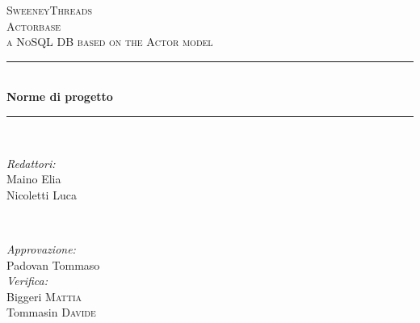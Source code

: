 \documentclass[a4paper]{report}
\begin{document}
	
	\begin{titlepage}
		\newcommand{\HRule}{\rule{\linewidth}{0.5mm}} 
		\center  
		
		\textsc{\LARGE SweeneyThreads}\\[1.5cm] 
		\textsc{\Large Actorbase}\\[0.5cm] 
		\textsc{\large a NoSQL DB based on the Actor model}\\[0.5cm]
		
		
		\HRule \\[0.4cm]
		{ \huge \bfseries Norme di progetto}\\[0.4cm] 
		\HRule \\[1.5cm]
		
		\begin{minipage}{0.4\textwidth}
			\begin{flushleft} \large
				\emph{Redattori:}\\
				Maino Elia \\
				Nicoletti Luca \\
			\end{flushleft}
		\end{minipage}
		~
		\begin{minipage}{0.4\textwidth}
			\begin{flushright} \large
				\emph{Approvazione:} \\
				Padovan Tommaso \\
				\emph{Verifica:} \\
				Biggeri \textsc{Mattia} \\
				Tommasin \textsc{Davide} \\
			\end{flushright}
		\end{minipage}
		

\end{titlepage}
\end{document}
